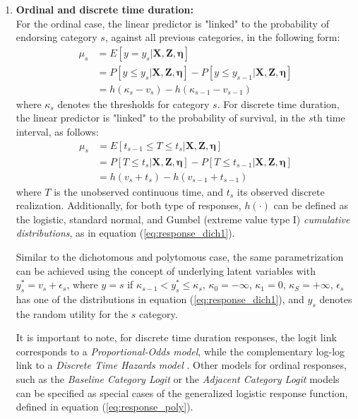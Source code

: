 \begin{enumerate}
	\item \textbf{Ordinal and discrete time duration:} \\
	For the ordinal case, the linear predictor is "linked" to the probability of endorsing category $s$, against all previous categories, in the following form:
	\begin{equation} \label{eq:link_ord1}
		\begin{split}
			\mu_{s} &= E[y = y_{s} | \mathbf{X}, \mathbf{Z}, \pmb{\eta}] \\
			&= P[y \leq y_{s} | \mathbf{X}, \mathbf{Z}, \pmb{\eta}] - P[y \leq y_{s-1} | \mathbf{X}, \mathbf{Z}, \pmb{\eta}] \\
			&= h(\kappa_{s} - v_{s}) - h(\kappa_{s-1} - v_{s-1})
		\end{split}
	\end{equation}
	where $\kappa_{s}$ denotes the thresholds for category $s$. For discrete time duration, the linear predictor is "linked" to the probability of survival, in the $s$th time interval, as follows:
	\begin{equation} \label{eq:link_ord2}
		\begin{split}
			\mu_{s} &= E[t_{s-1} \leq T \le t_{s} | \mathbf{X}, \mathbf{Z}, \pmb{\eta}] \\
			&= P[T \leq t_{s} | \mathbf{X}, \mathbf{Z}, \pmb{\eta}] - P[T \leq t_{s-1} | \mathbf{X}, \mathbf{Z}, \pmb{\eta}] \\
			&= h(v_{s} + t_{s}) - h(v_{s-1} + t_{s-1})
		\end{split}
	\end{equation}
	where $T$ is the unobserved continuous time, and $t_{s}$ its observed discrete realization. Additionally, for both type of responses, $h(\cdot)$ can be defined as the logistic, standard normal, and Gumbel (extreme value type I) \textit{cumulative distributions}, as in equation (\ref{eq:response_dich1}).
	
	Similar to the dichotomous and polytomous case, the same parametrization can be achieved using the concept of underlying latent variables with $y_{s}^{*} = v_{s} + \epsilon_{s}$, where $y = s$ if $\kappa_{s-1} < y_{s}^{*} \le \kappa_{s}$, $\kappa_{0}=-\infty$, $\kappa_{1}=0$, $\kappa_{S}=+\infty$, $\epsilon_{s}$ has one of the distributions in equation (\ref{eq:response_dich1}), and $y_{s}$ denotes the random utility for the $s$ category.
	
	It is important to note, for discrete time duration responses, the logit link corresponds to a \textit{Proportional-Odds model}, while the complementary log-log link to a \textit{Discrete Time Hazards model} \cite{Rabe_et_al_2001}. Other models for ordinal responses, such as the \textit{Baseline Category Logit} or the \textit{Adjacent Category Logit} models can be specified as special cases of the generalized logistic response function, defined in equation (\ref{eq:response_poly}). 
	

\end{enumerate}
